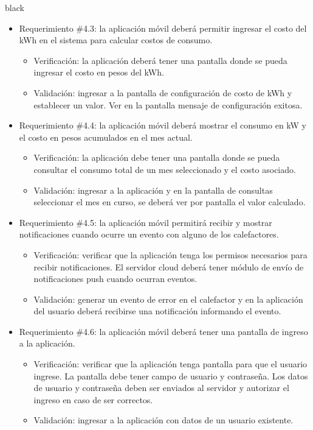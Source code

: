 \documentclass[
11pt, %
codirector, %
]{charter}
\begin{document}
\begin{consigna}{black}
\begin{itemize}
\item Requerimiento \#4.3: la aplicación móvil deberá permitir ingresar el costo del kWh en el sistema para calcular costos de consumo.

\begin{itemize}
	\item Verificación: la aplicación deberá tener una pantalla donde se pueda ingresar el costo en pesos del kWh.
	\item Validación: ingresar a la pantalla de configuración de costo de kWh y establecer un valor. Ver en la pantalla mensaje de configuración exitosa.
\end{itemize}

\item Requerimiento \#4.4: la aplicación móvil deberá mostrar el consumo en kW y el costo en pesos acumulados en el mes actual.

\begin{itemize}
	\item Verificación: la aplicación debe tener una pantalla donde se pueda consultar el consumo total de un mes seleccionado y el costo asociado.
	\item Validación: ingresar a la aplicación y en la pantalla de consultas seleccionar el mes en curso, se deberá ver por pantalla el valor calculado.
\end{itemize}

\item Requerimiento \#4.5: la aplicación móvil permitirá recibir y mostrar notificaciones cuando ocurre un evento con alguno de los calefactores.

\begin{itemize}
	\item Verificación: verificar que la aplicación tenga los permisos necesarios para recibir notificaciones. El servidor cloud deberá tener módulo de envío de notificaciones push cuando ocurran eventos.
	\item Validación: generar un evento de error en el calefactor y en la aplicación del usuario deberá recibirse una notificación informando el evento.
\end{itemize}

\item Requerimiento \#4.6: la aplicación móvil deberá tener una pantalla de ingreso a la aplicación.

\begin{itemize}
	\item Verificación: verificar que la aplicación tenga pantalla para que el usuario ingrese. La pantalla debe tener campo de usuario y contraseña. Los datos de usuario y contraseña deben ser enviados al servidor y autorizar el ingreso en caso de ser correctos. 
	\item Validación: ingresar a la aplicación con datos de un usuario existente.
\end{itemize}


\end{itemize}
\end{consigna}
\end{document}
